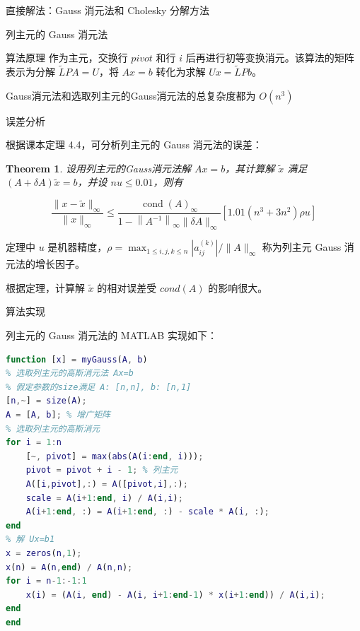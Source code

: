 \documentclass[a4paper]{article}
\newtheorem{myThm}{Theorem}
\begin{document}
\begin{multicols}{2}
\begin{section}{直接解法：Gauss 消元法和 Cholesky 分解方法}
\begin{subsection}{列主元的 Gauss 消元法}
\begin{subsubsection}{算法原理}
			作为主元，交换行 $pivot$ 和行 $i$ 后再进行初等变换消元。该算法的矩阵表示为分解 $\tilde{L} P A = U$，将 $Ax=b$ 转化为求解 $Ux=\tilde{L}Pb$。
			
			Gauss消元法和选取列主元的Gauss消元法的总复杂度都为 $O(n^3)$
		
		\end{subsubsection}
	
		\begin{subsubsection}{误差分析}
		
			根据课本定理 4.4，可分析列主元的 Gauss 消元法的误差：
			
			\begin{myThm}
			
				设用列主元的Gauss消元法解 $Ax=b$，其计算解 $\tilde{x}$ 满足 $(A+\delta A)\tilde{x} = b$，并设 $nu\leq 0.01$，则有
				
				\begin{small}
				$$\frac{\|x-\tilde{x}\|_{\infty}}{\|x\|_{\infty}} \leq \frac{\operatorname{cond}(A)_{\infty}}{1-\left\|A^{-1}\right\|_{\infty}\|\delta A\|_{\infty}}\left[1.01\left(n^{3}+3 n^{2}\right) \rho u\right]$$
				\end{small}
			
			\end{myThm}
			
			定理中 $u$ 是机器精度，$\rho = \max_{1\leq i,j,k\leq n} |a^{(k)}_{ij}| / \|A\|_{\infty}$ 称为列主元 Gauss 消元法的增长因子。
			
			根据定理，计算解 $\tilde{x}$ 的相对误差受 $cond(A)$ 的影响很大。
			
		\end{subsubsection}
	
		\begin{subsubsection}{算法实现}
		
			列主元的 Gauss 消元法的 MATLAB 实现如下：
			
			\begin{lstlisting}[language=Matlab]
function [x] = myGauss(A, b)
% 选取列主元的高斯消元法 Ax=b
% 假定参数的size满足 A: [n,n], b: [n,1]
[n,~] = size(A);
A = [A, b]; % 增广矩阵
% 选取列主元的高斯消元
for i = 1:n
    [~, pivot] = max(abs(A(i:end, i)));
    pivot = pivot + i - 1; % 列主元
    A([i,pivot],:) = A([pivot,i],:);
    scale = A(i+1:end, i) / A(i,i);
    A(i+1:end, :) = A(i+1:end, :) - scale * A(i, :);    
end
% 解 Ux=b1
x = zeros(n,1);
x(n) = A(n,end) / A(n,n);
for i = n-1:-1:1
    x(i) = (A(i, end) - A(i, i+1:end-1) * x(i+1:end)) / A(i,i);
end
end

			\end{lstlisting}
		

\end{subsubsection}
\end{subsection}
\end{section}
\end{multicols}
\end{document}
